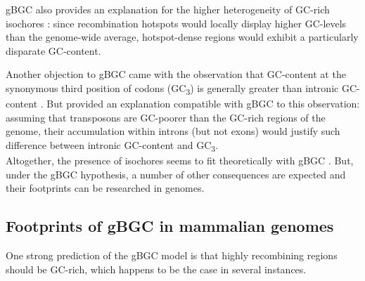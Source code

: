 \begin{mccorrection}
gBGC also provides an explanation for the higher heterogeneity of GC-rich isochores \citep{clay2001compositional,clay2001compositionala}: since recombination hotspots would locally display higher GC-levels than the genome-wide average, hotspot-dense regions would exhibit a particularly disparate GC-content.\\
\end{mccorrection}

Another objection to gBGC \citep{eyre-walker1999evidence} came with the observation that GC-content at the synonymous third position of codons (GC\textsubscript{3}) is generally greater than intronic GC-content \citep{clay1996human}.
But \citet{duret2001elevated} provided an explanation compatible with gBGC to this observation: assuming that transposons are GC-poorer than the GC-rich regions of the genome, their accumulation within introns (but not exons) would justify such difference between intronic GC-content and GC\textsubscript{3}.\\

Altogether, the presence of isochores seems to fit theoretically with gBGC \citep{duret2006new}.
But, under the gBGC hypothesis, a number of other consequences are expected and their footprints can be researched in genomes.



\subsection{Footprints of gBGC in mammalian genomes}

One strong prediction of the gBGC model is that highly recombining regions should be GC-rich, which happens to be the case in several instances.

